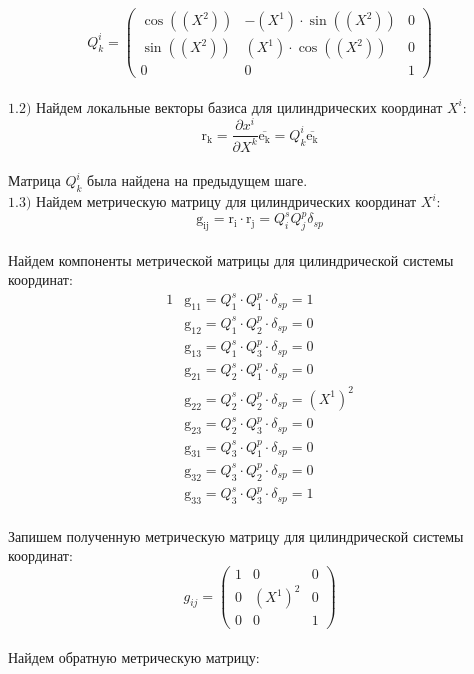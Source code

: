 \documentclass[a4paper, 12pt, oneside]{article}
\begin{document}
\[
Q^i_k=\begin{pmatrix}
	\cos((X^2)) & -(X^1)\cdot \sin((X^2)) & 0\\
	\sin((X^2)) & (X^1)\cdot \cos((X^2)) & 0\\
	0 & 0 & 1
\end{pmatrix}
\]\\
$\mathrm{1.2)}$ Найдем локальные векторы базиса для цилиндрических координат $X^i$:\\
\[
\mathrm{r_k} = \frac{\partial x^i}{\partial X^k}\overline{\mathrm{e_k}} = Q^i_k\overline{\mathrm{e_k}}
\]\\
Матрица $Q^i_k$ была найдена на предыдущем шаге.\\
$\mathrm{1.3)}$ Найдем метрическую матрицу для цилиндрических координат $X^i$:\\
\[
\mathrm{g_{{ij}}} = \mathrm{r_i}\cdot\mathrm{r_j} = Q^s_iQ^p_j\delta_{sp}
\]\\
Найдем компоненты метрической матрицы для цилиндрической системы координат:\\
\begin{alignat*}{1}
  & \mathrm{g_{11}} = Q^s_1 \cdot Q^p_1 \cdot \delta_{sp} = 1 \\
  & \mathrm{g_{12}} = Q^s_1 \cdot Q^p_2 \cdot \delta_{sp} = 0 \\
  & \mathrm{g_{13}} = Q^s_1 \cdot Q^p_3 \cdot \delta_{sp} = 0 \\
  & \mathrm{g_{21}} = Q^s_2 \cdot Q^p_1 \cdot \delta_{sp} = 0 \\
  & \mathrm{g_{22}} = Q^s_2 \cdot Q^p_2 \cdot \delta_{sp} = (X^1)^2 \\
  & \mathrm{g_{23}} = Q^s_2 \cdot Q^p_3 \cdot \delta_{sp} = 0 \\
  & \mathrm{g_{31}} = Q^s_3 \cdot Q^p_1 \cdot \delta_{sp} = 0 \\
  & \mathrm{g_{32}} = Q^s_3 \cdot Q^p_2 \cdot \delta_{sp} = 0 \\
  & \mathrm{g_{33}} = Q^s_3 \cdot Q^p_3 \cdot \delta_{sp} = 1 
\end{alignat*}\\
Запишем полученную метрическую матрицу для цилиндрической системы координат:\\
\[
g_{ij}=\begin{pmatrix}
	1 & 0 & 0\\
	0 & (X^1)^2 & 0\\
	0 & 0 & 1
\end{pmatrix}
\]\\
Найдем обратную метрическую матрицу:\\
\end{document}
